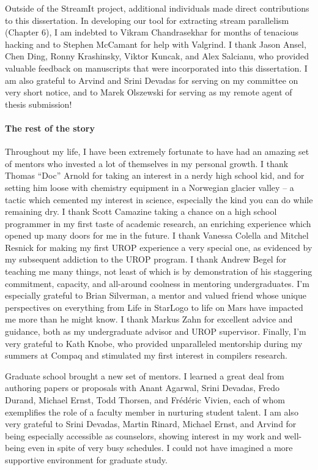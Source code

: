 Outside of the StreamIt project, additional individuals made direct
contributions to this dissertation.  In developing our tool for
extracting stream parallelism (Chapter 6), I am indebted to Vikram
Chandrasekhar for months of tenacious hacking and to Stephen McCamant
for help with Valgrind.  I thank Jason Ansel, Chen Ding, Ronny
Krashinsky, Viktor Kuncak, and Alex Salcianu, who provided valuable
feedback on manuscripts that were incorporated into this dissertation.
I am also grateful to Arvind and Srini Devadas for serving on my
committee on very short notice, and to Marek Olszewski for serving as
my remote agent of thesis submission!

\vspace{-8pt}\paragraph*{The rest of the story} Throughout my life,
I have been extremely fortunate to have had an amazing set of
mentors who invested a lot of themselves in my personal growth.  I
thank Thomas ``Doc'' Arnold for taking an interest in a nerdy high
school kid, and for setting him loose with chemistry equipment in a
Norwegian glacier valley -- a tactic which cemented my interest in
science, especially the kind you can do while remaining dry.
I thank Scott Camazine taking a chance on a high school programmer
in my first taste of academic research, an enriching experience
which
opened up many doors for me in the future.  I thank Vanessa Colella
and Mitchel Resnick for making my first UROP experience a very
special one, as evidenced by my subsequent addiction to the UROP
program.  I thank Andrew Begel for teaching me many things, not
least of which is by demonstration of his staggering commitment,
capacity, and all-around coolness in mentoring undergraduates.  I'm
especially grateful to Brian Silverman, a mentor and valued friend
whose unique perspectives on everything from Life in StarLogo to
life on Mars have impacted me more than he might know.  I thank
Markus Zahn for excellent advice and guidance, both as my
undergraduate advisor and UROP supervisor.  Finally, I'm very
grateful to Kath Knobe, who provided unparalleled mentorship during
my summers at Compaq and stimulated my first interest in compilers
research.

Graduate school brought a new set of mentors.  I learned a great
deal from authoring papers or proposals with Anant Agarwal, Srini
Devadas, Fredo Durand, Michael Ernst, Todd Thorsen, and
Fr\'{e}d\'{e}ric Vivien, each of whom exemplifies the role of a
faculty member in nurturing student talent.  I am also very grateful
to Srini Devadas, Martin Rinard, Michael Ernst, and Arvind for being
especially accessible as counselors, showing interest in my work and
well-being even in spite of very busy schedules.  I could not have
imagined a more supportive environment for graduate study.

